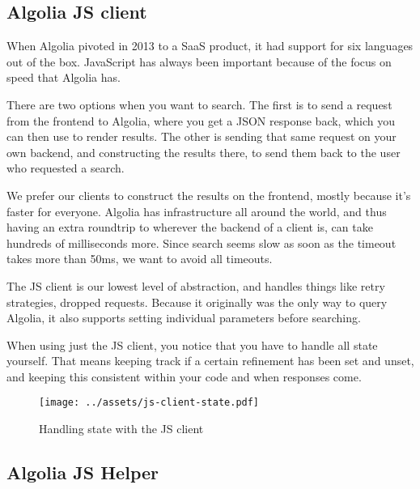 \subsection{Algolia JS client} %
\label{sub:algolia_js_client}

When Algolia pivoted\cite{algolia-blog-saas} in 2013 to a SaaS product, it had support\cite{algolia-blog-lauch} for six languages out of the box. JavaScript has always been important because of the focus on speed that Algolia has.

There are two options when you want to search. The first is to send a request from the frontend to Algolia, where you get a JSON response back, which you can then use to render results. The other is sending that same request on your own backend, and constructing the results there, to send them back to the user who requested a search.

We prefer our clients to construct the results on the frontend, mostly because it's faster for everyone. Algolia has infrastructure\cite{algolia-infra} all around the world, and thus having an extra roundtrip to wherever the backend of a client is, can take hundreds of milliseconds more. Since search seems slow as soon as the timeout takes more than 50ms, we want to avoid all timeouts.

The JS client\cite{algolia-js-client} is our lowest level of abstraction, and handles things like retry strategies, dropped requests. Because it originally was the only way to query Algolia, it also supports setting individual parameters before searching.

When using just the JS client, you notice that you have to handle all state yourself. That means keeping track if a certain refinement has been set and unset, and keeping this consistent within your code and when responses come.

\begin{figure}[H]
  \label{figure:company-logo}
  \centering
  \texttt{[image: ../assets/js-client-state.pdf]}
  \caption{Handling state with the JS client}
\end{figure}


\subsection{Algolia JS Helper} %
\label{sub:algolia_js_helper}

